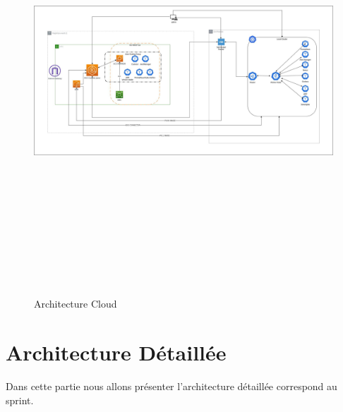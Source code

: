 \begin{figure}[H]
\begin{center}
\includegraphics[height=16cm,width=19cm]{aws global architecture.drawio.png}
\end{center}
\caption{Architecture Cloud}
\end{figure}


\section{\LARGE Architecture Détaillée}
\textsf{\selectfont{}Dans cette partie nous allons présenter l'architecture détaillée correspond au sprint.}

